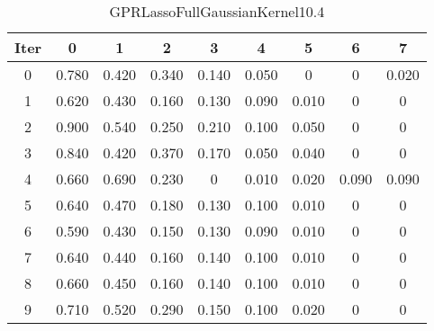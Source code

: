 \begin{table}
	\begin{center}
		\begin{tabular}{|c|c|c|c|c|c|c|c|c|}
			\hline
			Iter & 0 & 1 & 2 & 3 & 4 & 5 & 6 & 7 \\
			\hline
			0 & 0.780 & 0.420 & 0.340 & 0.140 & 0.050 & 0 & 0 & 0.020 \\
			\hline
			1 & 0.620 & 0.430 & 0.160 & 0.130 & 0.090 & 0.010 & 0 & 0 \\
			\hline
			2 & 0.900 & 0.540 & 0.250 & 0.210 & 0.100 & 0.050 & 0 & 0 \\
			\hline
			3 & 0.840 & 0.420 & 0.370 & 0.170 & 0.050 & 0.040 & 0 & 0 \\
			\hline
			4 & 0.660 & 0.690 & 0.230 & 0 & 0.010 & 0.020 & 0.090 & 0.090 \\
			\hline
			5 & 0.640 & 0.470 & 0.180 & 0.130 & 0.100 & 0.010 & 0 & 0 \\
			\hline
			6 & 0.590 & 0.430 & 0.150 & 0.130 & 0.090 & 0.010 & 0 & 0 \\
			\hline
			7 & 0.640 & 0.440 & 0.160 & 0.140 & 0.100 & 0.010 & 0 & 0 \\
			\hline
			8 & 0.660 & 0.450 & 0.160 & 0.140 & 0.100 & 0.010 & 0 & 0 \\
			\hline
			9 & 0.710 & 0.520 & 0.290 & 0.150 & 0.100 & 0.020 & 0 & 0 \\
			\hline
		\end{tabular}
	\end{center}
	\caption{GPRLassoFullGaussianKernel10.4}
\end{table}